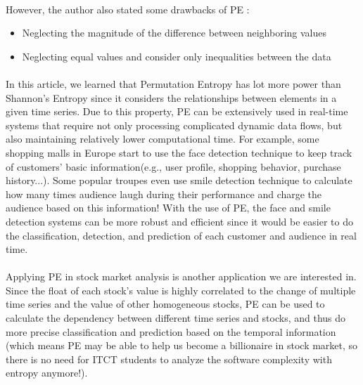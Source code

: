 \documentclass{article}
\begin{document}
\paragraph{}
However, the author also stated some drawbacks of PE : 
\begin{itemize}
\item Neglecting the magnitude of the difference between neighboring values 

\item Neglecting  equal values and consider only inequalities between the data

\end{itemize}


\paragraph{}
In this article, we learned that Permutation Entropy has lot more power than Shannon’s Entropy since it considers the relationships between elements in a given time series. Due to this property, PE can be extensively used in real-time systems that require not only processing complicated dynamic data flows, but also maintaining relatively lower computational time. For example, some shopping malls in Europe start to use the face detection technique to keep track of customers' basic information(e.g., user profile, shopping behavior, purchase history...). Some popular troupes even use smile detection technique to calculate how many times audience laugh during their performance and charge the audience based on this information! With the use of PE, the face and smile detection systems can be more robust and efficient since it would be easier to do the classification, detection, and prediction of each customer and audience in real time.
\paragraph{}
Applying PE in stock market analysis is another application we are interested in. Since the float of each stock's value is highly correlated to the change of multiple time series and the value of other homogeneous stocks, PE can be used to calculate the dependency between different time series and stocks, and thus do more precise classification and prediction based on the temporal information (which means PE may be able to help us become a billionaire in stock market, so there is no need for ITCT students to analyze the software complexity with entropy anymore!).
\end{document}
